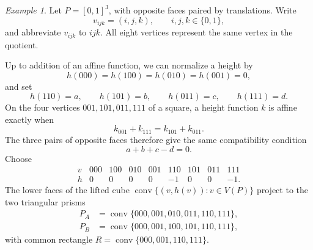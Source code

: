 \documentclass[oneside,a4paper,12pt]{article}
\newcommand{\conv}{\operatorname{conv}}
\theoremstyle{plain}
\theoremstyle{definition}
\theoremstyle{remark}
\newtheorem{example}[theorem]{Example}
\numberwithin{equation}{section}
\begin{document}
\begin{example}\label{example:cube}
Let $P=[0,1]^3$, with opposite faces paired by translations. Write
\begin{equation}
v_{ijk}=(i,j,k),\qquad i,j,k\in\{0,1\},
  \nonumber \end{equation}
and abbreviate $v_{ijk}$ to $ijk$. All eight vertices represent the same vertex in the quotient.

Up to addition of an affine function, we can normalize a height by
\begin{equation}
h(000)=h(100)=h(010)=h(001)=0,
  \nonumber \end{equation}
and set
\begin{equation}
h(110)=a,\qquad h(101)=b,\qquad h(011)=c,\qquad h(111)=d.
  \nonumber \end{equation}
On the four vertices $001,101,011,111$ of a square, a height function $k$ is affine exactly when
\begin{equation}
k_{001}+k_{111}=k_{101}+k_{011}.
  \nonumber \end{equation}
The three pairs of opposite faces therefore give the same compatibility condition
\begin{equation}
a+b+c-d=0.
  \nonumber \end{equation}
Choose
\begin{equation}
\begin{array}{c|cccccccc}
v&000&100&010&001&110&101&011&111\\ \hline
h&0&0&0&0&-1&0&0&-1.
\end{array}
  \nonumber \end{equation}
The lower faces of the lifted cube $\conv\{(v,h(v)):v\in V(P)\}$ project to the two triangular prisms
\begin{equation}
\begin{aligned}
P_A&=\conv\{000,001,010,011,110,111\},\\
P_B&=\conv\{000,001,100,101,110,111\},
\end{aligned}
  \nonumber \end{equation}
with common rectangle $R=\conv\{000,001,110,111\}$.


\end{example}
\end{document}
